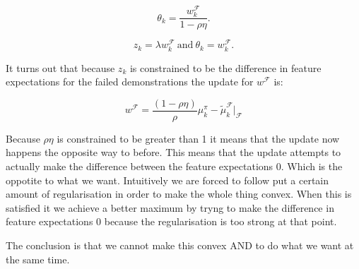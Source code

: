\documentclass{aamas2016}
\begin{document}
\begin{equation}
	 \theta_k= \frac{w^{\mathcal{F}}_k}{1- \rho \eta} .
\end{equation}

\begin{equation}
	z_k = \lambda w^{\mathcal{F}}_k~\mathrm{and}~\theta_k = w^{\mathcal{F}}_k.
\end{equation}

It turns out that because $z_k$ is constrained to be the difference in feature expectations for the failed demonstrations the update for $w^{\mathcal{F}}$ is:

\begin{equation}
	w^{\mathcal{F}} = \frac{(1-\rho\eta)}{\rho}\mu^{\pi}_k -\widetilde{\mu}^{\mathcal{F}}_k|_{\mathcal{F}}
\end{equation}

Because $\rho\eta$ is constrained to be greater than 1 it means that the update now happens the opposite way to before. This means that the update attempts to actually make the difference between the feature expectations 0. Which is the oppotite to what we want. Intuitively we are forced to follow put a certain amount of regularisation in order to make the whole thing convex. When this is satisfied it we achieve a better maximum by tryng to make the difference in feature expectations 0 because the regularisation is too strong at that point. 

The conclusion is that we cannot make this convex AND to do what we want at the same time.
\end{document}

